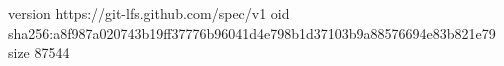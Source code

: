 version https://git-lfs.github.com/spec/v1
oid sha256:a8f987a020743b19ff37776b96041d4e798b1d37103b9a88576694e83b821e79
size 87544
